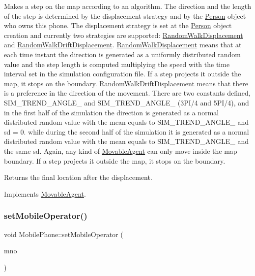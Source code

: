Makes a step on the map according to an algorithm. The direction and the length of the step is determined by the displacement strategy and by the \hyperlink{class_person}{Person} object who owns this phone. The displacement strategy is set at the \hyperlink{class_person}{Person} object creation and currently two strategies are supported\+: \hyperlink{class_random_walk_displacement}{Random\+Walk\+Displacement} and \hyperlink{class_random_walk_drift_displacement}{Random\+Walk\+Drift\+Displacement}. \hyperlink{class_random_walk_displacement}{Random\+Walk\+Displacement} means that at each time instant the direction is generated as a uniformly distributed random value and the step length is computed multiplying the speed with the time interval set in the simulation configuration file. If a step projects it outside the map, it stops on the boundary. \hyperlink{class_random_walk_drift_displacement}{Random\+Walk\+Drift\+Displacement} means that there is a preference in the direction of the movement. There are two constants defined, S\+I\+M\+\_\+\+T\+R\+E\+N\+D\+\_\+\+A\+N\+G\+L\+E\+\_ and S\+I\+M\+\_\+\+T\+R\+E\+N\+D\+\_\+\+A\+N\+G\+L\+E\+\_ (3\+P\+I/4 and 5\+P\+I/4), and in the first half of the simulation the direction is generated as a normal distributed random value with the mean equals to S\+I\+M\+\_\+\+T\+R\+E\+N\+D\+\_\+\+A\+N\+G\+L\+E\+\_ and sd = 0. while during the second half of the simulation it is generated as a normal distributed random value with the mean equals to S\+I\+M\+\_\+\+T\+R\+E\+N\+D\+\_\+\+A\+N\+G\+L\+E\+\_ and the same sd. Again, any kind of \hyperlink{class_movable_agent}{Movable\+Agent} can only move inside the map boundary. If a step projects it outside the map, it stops on the boundary. \begin{DoxyReturn}{Returns}
the final location after the displacement. 
\end{DoxyReturn}


Implements \hyperlink{class_movable_agent_a88b617f0e78c817634e5b587da045ab0}{Movable\+Agent}.

\mbox{\label{class_mobile_phone_ad4db8203e8f2e974733357d7c3e6cf28}} 
\subsubsection{\texorpdfstring{set\+Mobile\+Operator()}{setMobileOperator()}}
{\footnotesize\ttfamily void Mobile\+Phone\+::set\+Mobile\+Operator (\begin{DoxyParamCaption}\item[{\hyperlink{class_mobile_operator}{Mobile\+Operator} $\ast$}]{mno }\end{DoxyParamCaption})}


